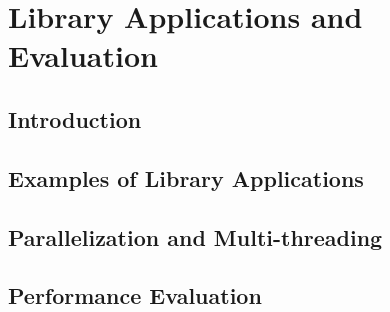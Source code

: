 
\setcounter{chapter}{3}
\chapter{Library Applications and Evaluation}
\minitoc %
\graphicspath{{Chapitre4/figures/}}

\pagestyle{fancy}
\fancyhf{}
\fancyhead[R]{\bfseries\rightmark}
\fancyfoot[R]{\thepage}
\renewcommand{\headrulewidth}{0.5pt}
\renewcommand{\footrulewidth}{0pt}
\renewcommand{\chaptermark}[1]{\markboth{{\chaptername~\thechapter. #1 }}{}}
\renewcommand{\sectionmark}[1]{\markright{\thechapter.\thesection~ #1}}

\begin{spacing}{1.2}

\section*{Introduction}

\section{Examples of Library Applications}
\section{Parallelization and Multi-threading}
\section{Performance Evaluation}




\end{spacing}
